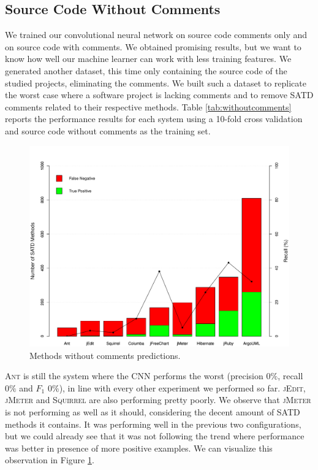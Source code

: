 
\subsection{Source Code Without Comments}


We trained our convolutional neural network on source code comments only and on source code with comments. We obtained promising results, but we want to know how well our machine learner can work with less training features. We generated another dataset, this time only containing the source code of the studied projects, eliminating the comments. We built such a dataset to replicate the worst case where a software project is lacking comments and to remove SATD comments related to their respective methods. Table \ref{tab:withoutcomments} reports the performance results for each system using a 10-fold cross validation and source code without comments as the training set.

\begin{figure}[h]
	\centering
	\includegraphics[scale=0.5]{figs/no-comments-pred.pdf}
	\caption{Methods without comments predictions.}
	\label{fig:no-comments-pred}
	\vspace{-4mm}
\end{figure}

\textsc{Ant} is still the system where the CNN performs the worst (precision $0\%$, recall $0\%$ and $F_1$ $0\%$), in line with every other experiment we performed so far. \textsc{jEdit}, \textsc{jMeter} and \textsc{Squirrel} are also performing pretty poorly. We observe that \textsc{jMeter} is not performing as well as it should, considering the decent amount of SATD methods it contains. It was performing well in the previous two configurations, but we could already see that it was not following the trend where performance was better in presence of more positive examples. We can visualize this observation in Figure \ref{fig:no-comments-pred}.

